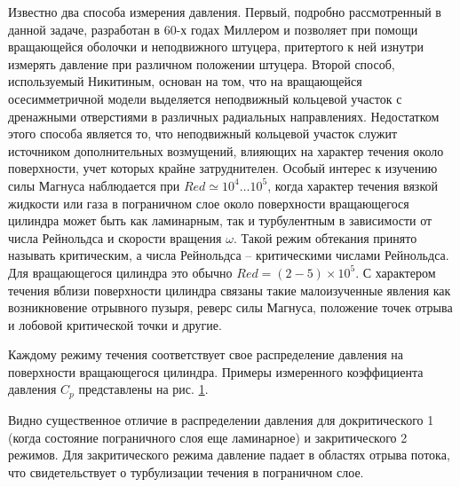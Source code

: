 \documentclass[specialist, subf, href, colorlinks=true, 14pt, final]{disser}
\theoremstyle{definition}
\begin{document}
Известно два способа измерения давления. Первый, подробно рассмотренный в данной задаче, разработан в 60-х годах Миллером и позволяет при помощи вращающейся оболочки и неподвижного штуцера, притертого к ней изнутри измерять давление при различном положении штуцера. Второй способ, используемый Никитиным, основан на том, что на вращающейся осесимметричной модели выделяется неподвижный кольцевой участок с дренажными отверстиями в различных радиальных направлениях. Недостатком этого способа является то, что неподвижный кольцевой участок служит источником дополнительных возмущений, влияющих на характер течения около поверхности, учет которых крайне затруднителен. Особый интерес к изучению силы Магнуса наблюдается при $Red \simeq 10^{4} \dots 10^{5}$, когда характер течения вязкой жидкости или газа в пограничном слое около поверхности вращающегося цилиндра может быть как ламинарным, так и турбулентным в зависимости от числа Рейнольдса и скорости вращения $\omega$. Такой режим обтекания принято называть критическим, а числа Рейнольдса -- критическими числами Рейнольдса. Для вращающегося цилиндра это обычно $Red = (2 - 5)\times 10^5$. С характером течения вблизи поверхности цилиндра связаны такие малоизученные явления как возникновение отрывного пузыря, реверс силы Магнуса, положение точек отрыва и лобовой критической точки и другие.

Каждому режиму течения соответствует свое распределение давления на поверхности вращающегося цилиндра. Примеры измеренного коэффициента давления $C_p$ представлены на рис. \ref{2-8-2}.
\begin{figure}[!htp]
  \caption{}
  \label{2-8-2}
\end{figure}

Видно существенное отличие в распределении давления для докритического 1 (когда состояние пограничного слоя еще ламинарное) и закритического 2 режимов. Для закритического режима давление падает в областях отрыва потока, что свидетельствует о турбулизации течения в пограничном слое. 
\end{document}
